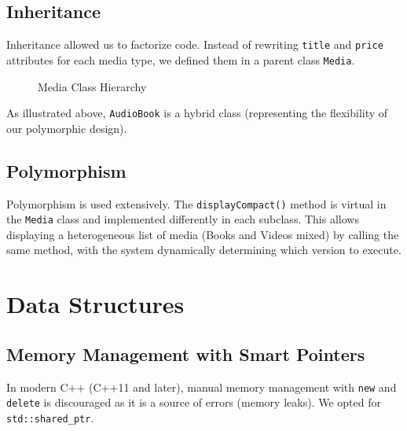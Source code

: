 \documentclass[12pt,a4paper]{report}
\begin{document}
\subsection{Inheritance}
Inheritance allowed us to factorize code. Instead of rewriting \texttt{title} and \texttt{price} attributes for each media type, we defined them in a parent class \texttt{Media}.

\begin{figure}[H]
    \centering
    \caption{Media Class Hierarchy}
\end{figure}

As illustrated above, \texttt{AudioBook} is a hybrid class (representing the flexibility of our polymorphic design).

\subsection{Polymorphism}
Polymorphism is used extensively. The \texttt{displayCompact()} method is virtual in the \texttt{Media} class and implemented differently in each subclass. This allows displaying a heterogeneous list of media (Books and Videos mixed) by calling the same method, with the system dynamically determining which version to execute.

\section{Data Structures}

\subsection{Memory Management with Smart Pointers}
In modern C++ (C++11 and later), manual memory management with \texttt{new} and \texttt{delete} is discouraged as it is a source of errors (memory leaks). We opted for \texttt{std::shared\_ptr}.
\end{document}
